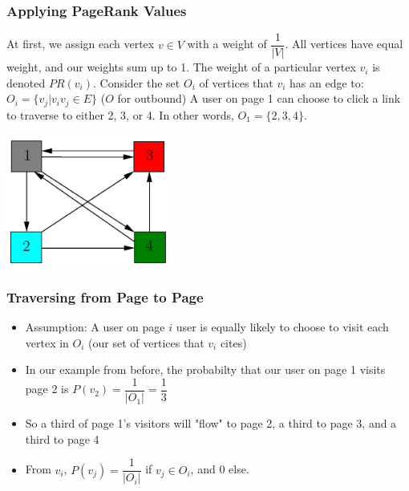 \documentclass{beamer}
\begin{document}
\begin{frame}[t]
\frametitle{Applying PageRank Values}
\begin{outline}
    \1 At first, we assign each vertex $v\in V$ with a weight of $\dfrac{1}{|V|}$. 
    \1 All vertices have equal weight, and our weights sum up to 1. The weight of a particular vertex $v_i$ is denoted $PR(v_i)$.
    \1 Consider the set $O_i$ of vertices that $v_i$ has an edge to:
        \2 $O_i = \{v_j | v_iv_j \in E\}$ ($O$ for outbound)
    \1 A user on page 1 can choose to click a link to traverse to either 2, 3, or 4. In other words, $O_1 = \{2, 3, 4\}$.
\end{outline}
\begin{center}
    \includegraphics[width=0.4\textwidth]{unweighted.png}
\end{center}
\end{frame}

\begin{frame}[t]
\frametitle{Traversing from Page to Page}
\begin{itemize}
    \setlength\itemsep{1em}
    \item Assumption: A user on page $i$ user is equally likely to choose to visit each vertex in $O_i$ (our set of vertices that $v_i$ cites)
    \item In our example from before, the probabilty that our user on page 1 visits page 2 is $P(v_2) = \dfrac{1}{|O_1|} = \dfrac{1}{3}$
    \item So a third of page 1's visitors will "flow" to page 2, a third to page 3, and a third to page 4
    \item From $v_i$, $P(v_j) = \dfrac{1}{|O_i|}$ if $v_j \in O_i$, and 0 else.
\end{itemize}
\end{frame}
\end{document}
